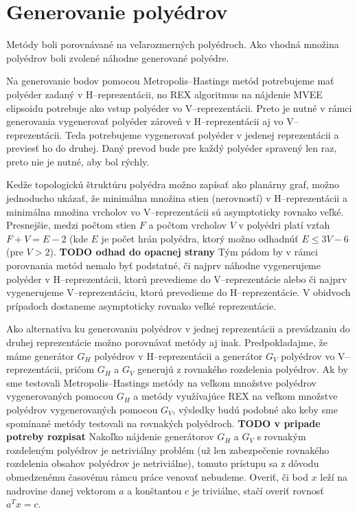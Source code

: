 \section{Generovanie polyédrov}
Metódy boli porovnávané na veľarozmerných polyédroch. 
Ako vhodná množina polyédrov boli zvolené náhodne generované polyédre.

Na generovanie bodov pomocou Metropolis--Hastings metód potrebujeme mať polyéder zadaný v H--reprezentácii, no REX algoritmus na nájdenie MVEE elipsoidu potrebuje ako vstup polyéder vo V--reprezentácii. Preto je nutné v rámci generovania vygenerovať polyéder zároveň v H--reprezentácii aj vo V--reprezentácii. Teda potrebujeme vygenerovať polyéder v jedenej reprezentácii a previesť ho do druhej. Daný prevod bude pre každý polyéder spravený len raz, preto nie je nutné, aby bol rýchly.

Kedže topologickú štruktúru polyédra možno zapísať ako planárny graf, možno jednoducho ukázať, že minimálna množina stien (nerovností) v H--reprezentácii a minimálna množina vrcholov vo V--reprezentácii sú asymptoticky rovnako veľké.
Presnejšie, medzi počtom stien $F$ a počtom vrcholov $V$ v polyédri platí vzťah $F+V=E-2$ (kde $E$ je počet hrán polyédra, ktorý možno odhadnúť $E \le 3V-6$ (pre $V>2$). \textbf{TODO odhad do opacnej strany}
Tým pádom by v rámci porovnania metód nemalo byť podstatné, či najprv náhodne vygenerujeme polyéder v H--reprezentácii, ktorú prevedieme do V--reprezentácie alebo či najprv vygenerujeme V--reprezentáciu, ktorú prevedieme do H--reprezentácie. V obidvoch prípadoch dostaneme asymptoticky rovnako veľké reprezentácie.

Ako alternatíva ku generovaniu polyédrov v jednej reprezentácii a prevádzaniu do druhej reprezentácie možno porovnávať metódy aj inak. 
Predpokladajme, že máme generátor $G_H$ polyédrov v H--reprezentácii a generátor $G_V$ polyédrov vo V--reprezentácii, pričom $G_H$ a $G_V$ generujú z rovnakého rozdelenia polyédrov.
Ak by sme testovali Metropolis--Hastings metódy na veľkom množstve polyédrov vygenerovaných pomocou $G_H$ a metódy využívajúce REX na veľkom množstve polyédrov vygenerovaných pomocou $G_V$, výsledky budú podobné ako keby sme spomínané metódy testovali na rovnakých polyédroch. \textbf{TODO v pripade potreby rozpisat}
Nakoľko nájdenie generátorov $G_H$ a $G_V$ s rovnakým rozdeleným polyédrov je netriviálny problém (už len zabezpečenie rovnakého rozdelenia obsahov polyédrov je netriviálne), tomuto prístupu sa z dôvodu obmedzenému časovému rámcu práce venovať nebudeme.
Overiť, či bod $x$ leží na nadrovine danej vektorom $a$ a konštantou $c$ je triviálne, stačí overiť rovnosť $a^Tx=c$.\\

